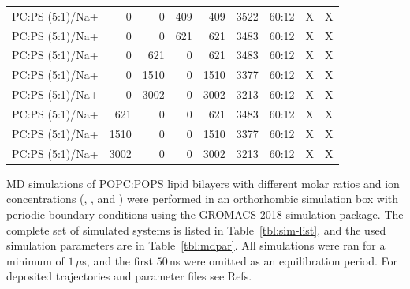 \documentclass[journal=jpcbfk,manuscript=article]{achemso}
\begin{document}
\begin{table}[tbp]
\begin{tabular}{l | r r r r | r r | c c }
PC:PS (5:1)/Na+  &      0  &      0  &    409  &    409  &  3522  &  60:12  &  X  &  X  \\ 
PC:PS (5:1)/Na+  &      0  &      0  &    621  &    621  &  3483  &  60:12  &  X  &  X  \\ 
PC:PS (5:1)/Na+  &      0  &    621  &      0  &    621  &  3483  &  60:12  &  X  &  X  \\ 
PC:PS (5:1)/Na+  &      0  &   1510  &      0  &   1510  &  3377  &  60:12  &  X  &  X  \\ 
PC:PS (5:1)/Na+  &      0  &   3002  &      0  &   3002  &  3213  &  60:12  &  X  &  X  \\ 
PC:PS (5:1)/Na+  &    621  &      0  &      0  &    621  &  3483  &  60:12  &  X  &  X  \\ 
PC:PS (5:1)/Na+  &   1510  &      0  &      0  &   1510  &  3377  &  60:12  &  X  &  X  \\ 
PC:PS (5:1)/Na+  &   3002  &      0  &      0  &   3002  &  3213  &  60:12  &  X  &  X  \\ 
  \hline
\end{tabular}
\end{table}


MD simulations of POPC:POPS lipid bilayers with different molar ratios 
and ion concentrations (, ,  and )
were performed in an orthorhombic simulation box with periodic boundary conditions
using the GROMACS 2018 \cite{Abraham15} simulation package. 
The complete set of simulated systems is listed in Table~\ref{tbl:sim-list},
and the used simulation parameters are in Table~\ref{tbl:mdpar}. 
All simulations were ran for a minimum of $1 \, \mu$s,
and the first  $50 \,$ns were omitted as an equilibration period. 
For deposited trajectories and parameter files see 
Refs.~
\end{document}
